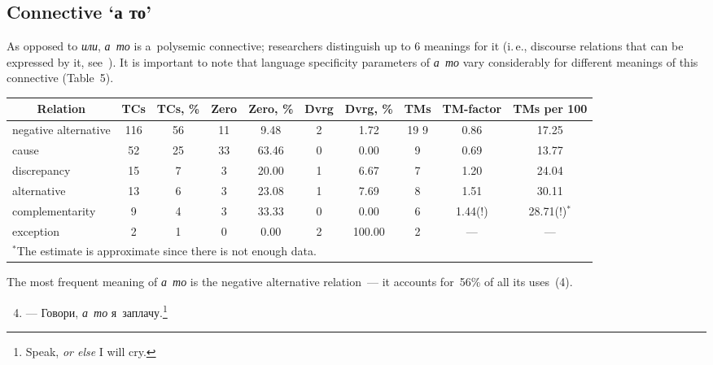 \begin{multicols}{2}
  \subsection{Connective `а то'}
  
  \noindent 
  As opposed to \textit{или}, \textit{а~то} is a~polysemic connective; researchers 
distinguish up to 6 meanings for it (i.\,e., discourse relations that can be expressed 
by it, see~\cite{10-in}). It is important to note that language specificity parameters of 
\textit{а~то} vary considerably for different meanings of this connective (Table~5).
  
  
  \begin{table*}\small %
  \begin{center}
  \vspace*{2ex}
  
  \begin{tabular}{lccccccccc}
  \hline
\multicolumn{1}{c}{Relation}&TCs&TCs, \%&Zero&Zero, \%&Dvrg&Dvrg, 
\%&TMs&TM-factor&TMs per 100 \\
\hline
negative 
alternative&116\hphantom{9}&56&11&\hphantom{9}9.48&2&1.72&19\hphantom
{9}&0.86&17.25\\
cause&52&25&33&63.46&0&0.00&9&0.69&13.77\\
discrepancy&15&\hphantom{9}7&\hphantom{9}3&20.00&1&6.67&7&1.20&24.04
\\
alternative&13&\hphantom{9}6&\hphantom{9}3&23.08&1&7.69&8&1.51&30.11\\
complementarity&\hphantom{9}9&\hphantom{9}4&\hphantom{9}3&33.33&0&0.00&6&
\hphantom{(!)}1.44(!)&\hphantom{(!)$^*$}28.71(!)$^*$\\
exception&\hphantom{9}2&\hphantom{9}1&\hphantom{9}0&\hphantom{9}0.00&
2&100.00\hphantom{99}&2&---&---\\
  \hline
  \multicolumn{10}{l}{\footnotesize 
  \hspace*{2mm}$^*$The estimate is approximate since there is not enough data.}
   \end{tabular}
   \end{center}
   \end{table*}
  
  The most frequent meaning of \textit{а~то} is the negative alternative relation~--- 
it accounts for~56\% of all its uses~(4).
  \begin{enumerate}[(1)]
  \setcounter{enumi}{3}
  \item --- Говори, \textit{а~то} я~заплачу.\footnote[1]{Speak, \textit{or else} I will cry.}  
   

\end{enumerate}
\end{multicols}
